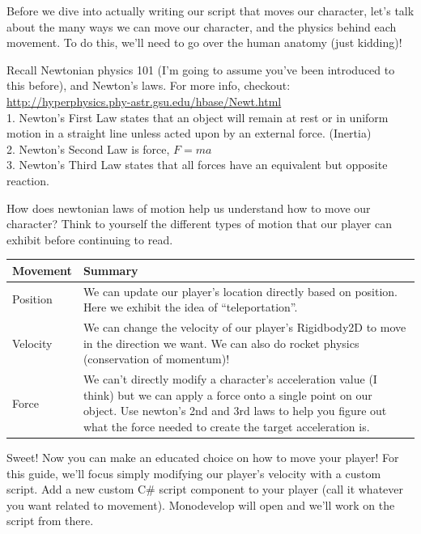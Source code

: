 \documentclass[12pt]{article}
\begin{document}
Before we dive into actually writing our script that moves our character, let's talk about the many ways we can move our character, and the physics behind each movement. To do this, we'll need to go over the human anatomy (just kidding)!

Recall Newtonian physics 101 (I'm going to assume you've been introduced to this before), and Newton's laws. For more info, checkout: \url{http://hyperphysics.phy-astr.gsu.edu/hbase/Newt.html}\\
1. Newton's First Law states that an object will remain at rest or in uniform motion in a straight line unless acted upon by an external force. (Inertia)\\
2. Newton's Second Law is force, $F = ma$ \\
3. Newton's Third Law states that all forces have an equivalent but opposite reaction.

How does newtonian laws of motion help us understand how to move our character? Think to yourself the different types of motion that our player can exhibit before continuing to read. 

\begin{center}
    \begin{tabular}{| l | p{10cm} | }
    \hline
    Movement & Summary \\ \hline
    Position & We can update our player's location directly based on position. Here we exhibit the idea of ``teleportation''. \\ \hline
    Velocity & We can change the velocity of our player's Rigidbody2D to move in the direction we want. We can also do rocket physics (conservation of momentum)!\\ \hline
    Force & We can't directly modify a character's acceleration value (I think) but we can apply a force onto a single point on our object. Use newton's 2nd and 3rd laws to help you figure out what the force needed to create the target acceleration is.\\ \hline
    \end{tabular}
\end{center}
\vspace{1.5cm}

Sweet! Now you can make an educated choice on how to move your player! For this guide, we'll focus simply modifying our player's velocity with a custom script. Add a new custom C\# script component to your player (call it whatever you want related to movement). Monodevelop will open and we'll work on the script from there.
\end{document}

